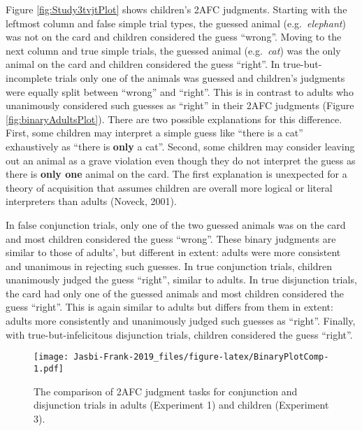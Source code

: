\documentclass[
  english,
  ,man,floatsintext]{apa6}
\begin{document}
Figure \ref{fig:Study3tvjtPlot} shows children's 2AFC judgments. Starting with the leftmost column and false simple trial types, the guessed animal (e.g.~\emph{elephant}) was not on the card and children considered the guess \enquote{wrong}. Moving to the next column and true simple trials, the guessed animal (e.g.~\emph{cat}) was the only animal on the card and children considered the guess \enquote{right}. In true-but-incomplete trials only one of the animals was guessed and children's judgments were equally split between \enquote{wrong} and \enquote{right}. This is in contrast to adults who unanimously considered such guesses as \enquote{right} in their 2AFC judgments (Figure \ref{fig:binaryAdultsPlot}). There are two possible explanations for this difference. First, some children may interpret a simple guess like \enquote{there is a cat} exhaustively as \enquote{there is \textbf{only} a cat}. Second, some children may consider leaving out an animal as a grave violation even though they do not interpret the guess as there is \textbf{only one} animal on the card. The first explanation is unexpected for a theory of acquisition that assumes children are overall more logical or literal interpreters than adults (Noveck, 2001).

In false conjunction trials, only one of the two guessed animals was on the card and most children considered the guess \enquote{wrong}. These binary judgments are similar to those of adults', but different in extent: adults were more consistent and unanimous in rejecting such guesses. In true conjunction trials, children unanimously judged the guess \enquote{right}, similar to adults. In true disjunction trials, the card had only one of the guessed animals and most children considered the guess \enquote{right}. This is again similar to adults but differs from them in extent: adults more consistently and unanimously judged such guesses as \enquote{right}. Finally, with true-but-infelicitous disjunction trials, children considered the guess \enquote{right}.

\begin{figure}
\centering
\texttt{[image: Jasbi-Frank-2019\_files/figure-latex/BinaryPlotComp-1.pdf]}
\caption{\label{fig:BinaryPlotComp}The comparison of 2AFC judgment tasks for conjunction and disjunction trials in adults (Experiment 1) and children (Experiment 3).}
\end{figure}
\end{document}

